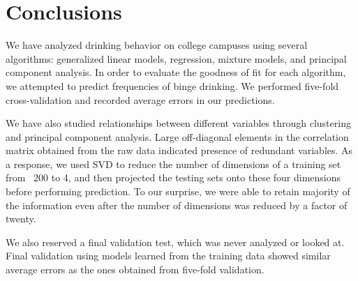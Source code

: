 \section{Conclusions}
\label{sec:conclusions}
We have analyzed drinking behavior on college campuses using several algorithms: generalized linear models, regression, mixture models, and principal component analysis. In order to evaluate the goodness of fit for each algorithm, we attempted to predict frequencies of binge drinking. We performed five-fold cross-validation and recorded average errors in our predictions. 

We have also studied relationships between different variables through clustering and principal component analysis. Large off-diagonal elements in the correlation matrix obtained from the raw data indicated presence of redundant variables. As a response, we used SVD to reduce the number of dimensions of a training set from ~200 to 4, and then projected the testing sets onto these four dimensions before performing prediction. To our surprise, we were able to retain majority of the information even after the number of dimensions was reduced by a factor of twenty.
 
We also reserved a final validation test, which was never analyzed or looked at. Final validation using models learned from the training data showed similar average errors as the ones obtained from five-fold validation.